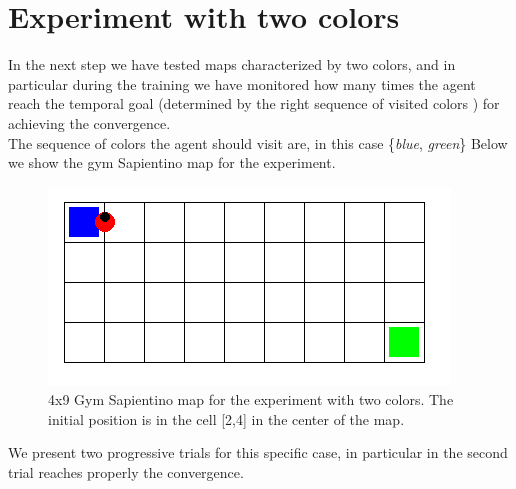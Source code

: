 \documentclass{article}
\begin{document}

\section{Experiment with two colors }

In the next step we have tested maps characterized by two colors, and in particular during the training we have monitored how many times the agent reach the temporal goal (determined by the right sequence of  visited colors ) for achieving the convergence.\\
The sequence of colors the agent should visit are, in this case \{\textit{blue}, \textit{green}\}
Below we show the gym Sapientino map for the experiment.

\begin{figure}[h!]
    \centering
    \includegraphics[width = \textwidth]{images/map2_easy.png}
    \caption{4x9 Gym Sapientino map for the experiment with two colors. The initial position is in the cell [2,4] in the center of the map.}
    \label{fig:mapTwoColors}
\end{figure}

\noindent
We present two progressive trials for this specific case, in particular in the second trial reaches properly the convergence. 
\end{document}
